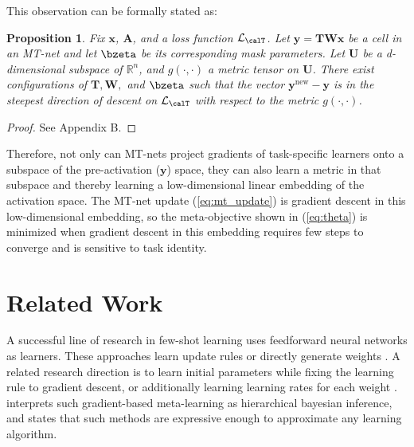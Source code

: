 \documentclass{article}
\newtheorem{prop}{Proposition}
\newcommand{\x}{\mathbf{x}}
\newcommand{\y}{\mathbf{y}}
\newcommand{\A}{\mathbf{A}}
\newcommand{\W}{\mathbf{W}}
\newcommand{\T}{\mathbf{T}}
\newcommand{\logit}{\bzeta}
\newcommand{\loss}{\mathcal{L}_{\calT}}
\newcommand{\U}{\mathbf{U}}
\newcommand{\Rn}{\mathbb{R}^n}
\begin{document}
This observation can be formally stated as:
\begin{prop}
\label{prop2}
Fix $\x$, $\A$, and a loss function $\loss$.
Let $\y = \T \W \x$ be a cell in an MT-net and let $\logit$ be its corresponding mask parameters.
Let $\U$ be a d-dimensional subspace of $\Rn$, and $g(\cdot , \cdot)$ a metric tensor on $\U$.
There exist configurations of $\T, \W,$ and $\logit$ such that the vector $\y^\text{new}-\y$ is in 
the steepest direction of descent on $\loss$ with respect to the metric $g(\cdot , \cdot)$.
\end{prop}

\begin{proof}
See Appendix B.
\end{proof}
Therefore, not only can MT-nets project gradients of task-specific learners onto a subspace of the pre-activation ($\y$) space,
they can also learn a metric in that subspace and thereby learning a low-dimensional linear embedding of the activation space.
The MT-net update (\ref{eq:mt_update}) is gradient descent in this low-dimensional embedding,
so the meta-objective shown in (\ref{eq:theta}) is minimized when gradient descent in this embedding requires few steps to converge and is sensitive to task identity.



\section{Related Work}

\iffalse
A straightforward approach for applying meta-learning to deep networks is to meta-learn some pattern of the weights of a neural network or its updates; previous work has learned an update rule \cite{RaviS2017iclr, Li2016nips, Andrychowicz2016nips}, directly generated weights \cite{Ha2017iclr}, or learned good initial weights to fine-tune \cite{FinnC2017arxiv}.
Another line of research uses recurrent neural networks to encode a learning rule and sequentially inputs training data to this neural network \cite{SantoroA2016icml,Mishra2018iclr,MunkhdalaiT2017icml,Duan2016arxiv, Wang2016arxiv}.
An approach that has been successful in the domain of few-shot classification is to learn a distance metric between images and use this metric to find the most similar previously seen image to a new image \cite{KochG2015icml, VinyalsO2016nips, SnellJ2017nips}.
\fi

A successful line of research in few-shot learning uses feedforward neural networks as learners.
These approaches learn update rules \cite{RaviS2017iclr, Li2016nips, Andrychowicz2016nips} or directly generate weights \cite{Ha2017iclr}.
A related research direction is to learn initial parameters \cite{FinnC2017icml} while fixing the learning rule to gradient descent,
 or additionally learning learning rates for each weight \cite{Li2017arxiv}.
\cite{Grant2018iclr} interprets such gradient-based meta-learning as hierarchical bayesian inference, and
\cite{FinnC2017arxiv} states that such methods are expressive enough to approximate any learning algorithm.
\end{document}
